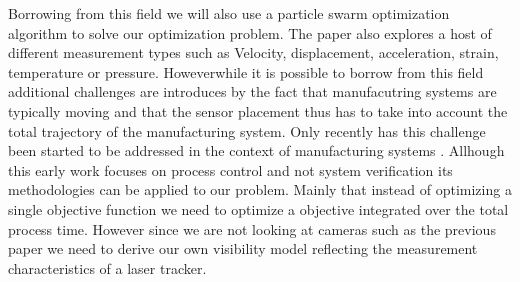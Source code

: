 \documentclass{svproc}
\begin{document}
Borrowing from this field we will also use a particle swarm optimization algorithm to solve our optimization problem.
The paper also explores a host of different measurement types such as Velocity, displacement, acceleration, strain, temperature or pressure.
Howeverwhile it is possible to borrow from this field additional challenges are introduces by the fact that manufacutring systems are typically moving
and that the sensor placement thus has to take into account the total trajectory of the manufacturing system.
Only recently has this challenge been started to be addressed in the context of manufacturing systems \cite{ieee_sensors}.
Allhough this early work focuses on process control and not system verification its methodologies can be applied to our problem.
Mainly that instead of optimizing a single objective function we need to optimize a objective integrated over the total process time.
However since we are not looking at cameras such as the previous paper we need to derive our own visibility model reflecting the measurement characteristics of a laser tracker.
\end{document}
